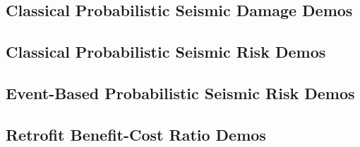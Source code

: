 \subsection{Classical Probabilistic Seismic Damage Demos}
\label{subsec:demos_classical_damage}


\subsection{Classical Probabilistic Seismic Risk Demos}
\label{subsec:demos_classical_risk}


\subsection{Event-Based Probabilistic Seismic Risk Demos}
\label{subsec:demos_event_based_risk}


\subsection{Retrofit Benefit-Cost Ratio Demos}
\label{subsec:demos_benefit_cost}

